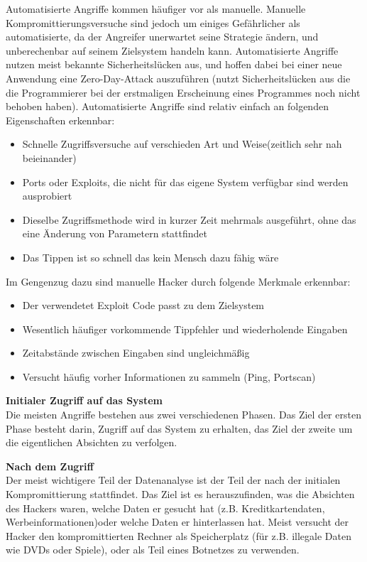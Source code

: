 \noindent Automatisierte Angriffe kommen häufiger vor als manuelle. Manuelle Kompromittierungsversuche sind jedoch um einiges Gefährlicher als automatisierte, da der Angreifer unerwartet seine Strategie ändern, und unberechenbar auf seinem Zielsystem handeln kann. Automatisierte Angriffe nutzen meist bekannte Sicherheitslücken aus, und hoffen dabei bei einer neue Anwendung eine Zero-Day-Attack auszuführen (nutzt Sicherheitslücken aus die die Programmierer bei der erstmaligen Erscheinung eines Programmes noch nicht behoben haben). 
Automatisierte Angriffe sind relativ einfach an folgenden Eigenschaften erkennbar:
\begin{itemize}
\item Schnelle Zugriffsversuche auf verschieden Art und Weise(zeitlich sehr nah beieinander)
\item Ports oder Exploits, die nicht für das eigene System verfügbar sind werden ausprobiert
\item Dieselbe Zugriffsmethode wird in kurzer Zeit mehrmals ausgeführt, ohne das eine Änderung von Parametern stattfindet
\item Das Tippen ist so schnell das kein Mensch dazu fähig wäre 
\end{itemize}

\noindent Im Gengenzug dazu sind manuelle Hacker durch folgende Merkmale erkennbar:

\begin{itemize}
\item Der verwendetet Exploit Code passt zu dem Zielsystem
\item Wesentlich häufiger vorkommende Tippfehler und wiederholende Eingaben
\item Zeitabstände zwischen Eingaben sind ungleichmäßig
\item Versucht häufig vorher Informationen zu sammeln (Ping, Portscan)
\end{itemize}

\noindent \textbf{Initialer Zugriff auf das System}\\
Die meisten Angriffe bestehen aus zwei verschiedenen Phasen. Das Ziel der ersten Phase besteht darin, Zugriff auf das System zu erhalten, das Ziel der zweite um die eigentlichen Absichten zu verfolgen.

\noindent \textbf{Nach dem Zugriff}\\
Der meist wichtigere Teil der Datenanalyse ist der Teil der nach der initialen Kompromittierung stattfindet. Das Ziel ist es herauszufinden, was die Absichten des Hackers waren, welche Daten er gesucht hat (z.B. Kreditkartendaten, Werbeinformationen)oder welche Daten er hinterlassen hat. Meist versucht der Hacker den kompromittierten Rechner als Speicherplatz (für z.B. illegale Daten wie DVDs oder Spiele), oder als Teil eines Botnetzes zu verwenden. \\

